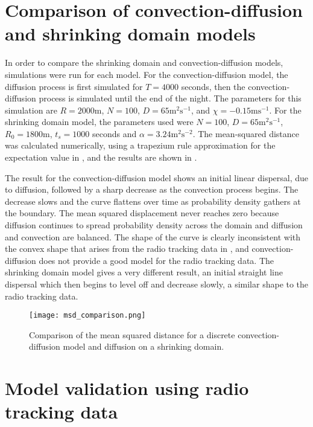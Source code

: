 
\section{Comparison of convection-diffusion and shrinking domain models}

In order to compare the shrinking domain and convection-diffusion models, simulations were run for each model. For the convection-diffusion model, the diffusion process is first simulated for $T = 4000$ seconds, then the convection-diffusion process is simulated until the end of the night. The parameters for this simulation are $R = 2000$m, $N = 100$,
$D = 65\mathrm{m^2s^{-1}}$, and $\chi =  - 0.15\mathrm{ms^{-1}}$. For the shrinking domain model, the parameters used were $N = 100$, $D = 65\mathrm{m^2s^{-1}}$, $R_0 = 1800\mathrm{m}$, $t_s = 1000$ seconds and $\alpha  = 3.24 \mathrm{m^2s^{-2}}$. The mean-squared distance was calculated numerically, using a trapezium rule
approximation for the expectation value in , and the results are shown in .

The result for the convection-diffusion model shows an initial linear dispersal, due to diffusion, followed by a sharp decrease as the convection process begins. The decrease slows and the curve flattens over time as probability density gathers at the boundary. The mean squared displacement never reaches zero because diffusion continues to spread probability density across the domain and diffusion and convection are balanced. The shape of the curve is clearly inconsistent with the convex shape that arises from the radio tracking data in , and convection-diffusion does not provide a good model for the radio tracking data. The shrinking domain model gives a very different result, an initial straight line dispersal which then begins to level off and decrease slowly, a similar shape to the radio tracking data.

\begin{figure} [h]
    \centering
        \texttt{[image: msd\_comparison.png]}
        \caption{Comparison of the mean squared distance for a discrete convection-diffusion model and diffusion on a shrinking domain.
        }
    \label{fig:c-d_shrink}
\end{figure}

\section{Model validation using radio tracking data}

